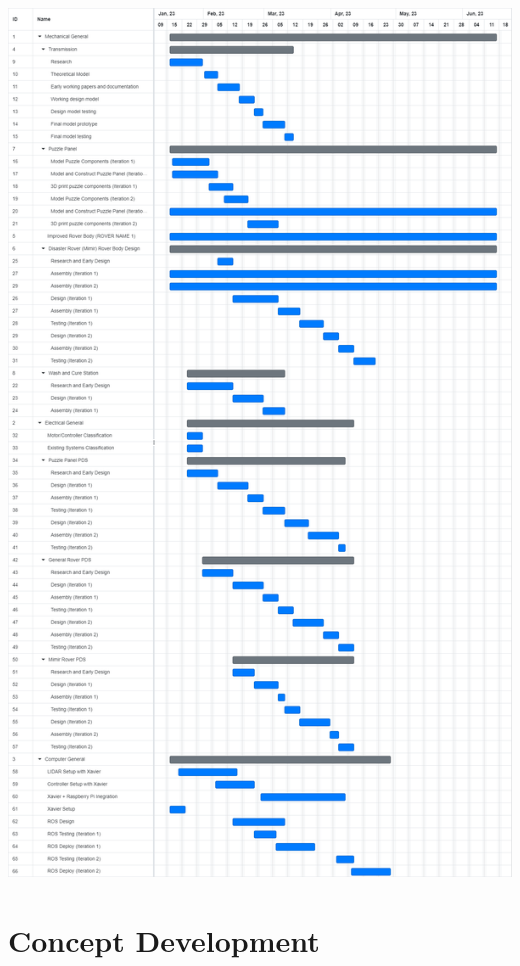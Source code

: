 \documentclass[a4paper, 10pt]{article}
\begin{document}
\includegraphics[scale=0.3]{Gantt Chart}

\pagebreak	

\section{Concept Development}
\end{document}

